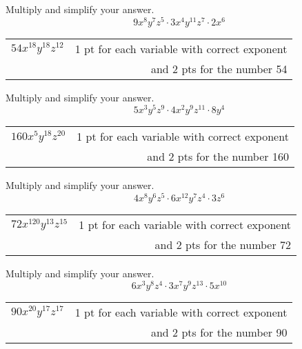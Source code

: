 {
	Multiply and simplify your answer. 
	$$9x^8 y^7 z^5 \cdot 3x^4 y^{11} z^7\cdot 2x^6$$
}
{
	\begin{tabular}{l r}
	$54 x^{18} y^{18}z^{12}$ & 1 pt for each variable with correct exponent\\ & and 2 pts for the number 54
	\end{tabular}
}

{
	Multiply and simplify your answer. 
	$$5x^3 y^5 z^9 \cdot 4x^2 y^{9} z^{11}\cdot 8y^4$$
}
{
	\begin{tabular}{l r}
	$160 x^{5} y^{18}z^{20}$ & 1 pt for each variable with correct exponent\\ & and 2 pts for the number 160
	\end{tabular}
}
{
	Multiply and simplify your answer. 
	$$4x^8 y^6 z^5 \cdot 6x^{12} y^{7} z^4\cdot 3z^6$$
}
{
	\begin{tabular}{l r}
	$72 x^{120} y^{13}z^{15}$ & 1 pt for each variable with correct exponent\\ & and 2 pts for the number 72
	\end{tabular}
}
{
	Multiply and simplify your answer. 
	$$6x^3 y^8 z^4 \cdot 3x^7 y^{9} z^{13}\cdot 5x^{10}$$
}
{
	\begin{tabular}{l r}
	$90 x^{20} y^{17}z^{17}$ & 1 pt for each variable with correct exponent\\ & and 2 pts for the number 90
	\end{tabular}
}